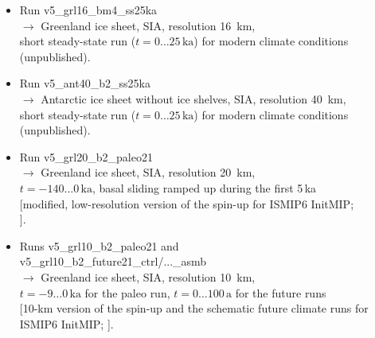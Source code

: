 \documentclass[12pt,a4paper]{article}
\begin{document}
\begin{itemize}
\begin{itemize}
\item
Run v5\_grl16\_bm4\_ss25ka
\\
$\longrightarrow$ Greenland ice sheet, SIA, resolution 16~km,
\\
\phantom{$\longrightarrow$} short steady-state run ($t=0\ldots{}25\,\mathrm{ka}$) for modern climate conditions
\\
\phantom{$\longrightarrow$} (unpublished).

\item
Run v5\_ant40\_b2\_ss25ka 
\\
$\longrightarrow$ Antarctic ice sheet without ice shelves, SIA, resolution 40~km,
\\
\phantom{$\longrightarrow$} short steady-state run ($t=0\ldots{}25\,\mathrm{ka}$) for modern climate conditions
\\
\phantom{$\longrightarrow$} (unpublished).

\item
Run v5\_grl20\_b2\_paleo21
\\
$\longrightarrow$ Greenland ice sheet, SIA, resolution 20~km,
\\
\phantom{$\longrightarrow$} $t=-140\ldots{}0\,\mathrm{ka}$, basal sliding ramped up during the first 5\,ka
\\
\phantom{$\longrightarrow$} [modified, low-resolution version of the spin-up for ISMIP6 InitMIP; 
\\
\phantom{$\longrightarrow$} \citet{greve_etal_2017a}].

\item
Runs v5\_grl10\_b2\_paleo21 and
\\{}
\phantom{Runs} v5\_grl10\_b2\_future21\_ctrl/...\_asmb
\\
$\longrightarrow$ Greenland ice sheet, SIA, resolution 10~km,
\\
\phantom{$\longrightarrow$} $t=-9\ldots{}0\,\mathrm{ka}$ for the paleo run, $t=0\ldots{}100\,\mathrm{a}$ for the future runs
\\{}
\phantom{$\longrightarrow$} [10-km version of the spin-up and the schematic future climate runs for 
\\
\phantom{$\longrightarrow$} ISMIP6 InitMIP; \citet{greve_etal_2017a}].


\end{itemize}
\end{itemize}
\end{document}
